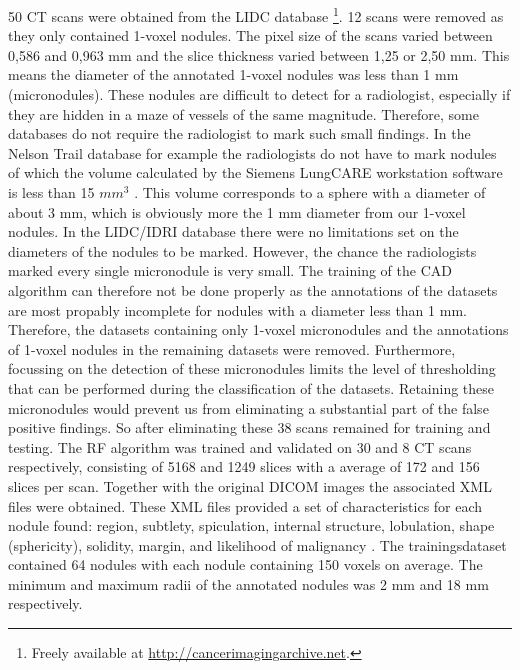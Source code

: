 50 CT scans were obtained from the LIDC database \footnote{Freely available
at \url{http://cancerimagingarchive.net}.}. 12 scans were removed as they only
contained 1-voxel nodules. The pixel size of the scans varied between 0,586 and
0,963 mm and the slice thickness varied between 1,25 or 2,50 mm. This means the
diameter of the annotated 1-voxel nodules was less than 1 mm (micronodules).
These nodules are difficult to detect for a radiologist, especially if they are
hidden in a maze of vessels of the same magnitude. Therefore, some databases do
not require the radiologist to mark such small findings. In the Nelson Trail
database for example the radiologists do not have to mark nodules of which the
volume calculated by the Siemens LungCARE workstation software is less than 15
$mm^3$ \cite{mur}. This volume corresponds to a sphere with a diameter of about
3 mm, which is obviously more the 1 mm diameter from our 1-voxel nodules.
In the LIDC/IDRI database there were no limitations set on the diameters of the
nodules to be marked. However, the chance the radiologists marked every single
micronodule is very small. The training of the CAD algorithm can therefore not
be done properly as the annotations of the datasets are most propably incomplete
for nodules with a diameter less than 1 mm. Therefore, the datasets containing
only 1-voxel micronodules and the annotations of 1-voxel nodules in the
remaining datasets were removed. Furthermore, focussing on the detection of
these micronodules limits the level of thresholding that can be performed during
the classification of the datasets. Retaining these micronodules would prevent
us from eliminating a substantial part of the false positive findings. So
after eliminating these 38 scans remained for training and testing.
The RF algorithm was trained and validated on 30 and 8 CT scans respectively,
consisting of 5168 and 1249 slices with a average of 172 and 156 slices per
scan. Together with the original DICOM images the associated XML files
were obtained. These XML files provided a set of characteristics for each nodule
found: region, subtlety, spiculation, internal structure, lobulation, shape
(sphericity), solidity, margin, and likelihood of malignancy \cite{lidcbase}.
The trainingsdataset contained 64 nodules with each nodule containing 150 voxels
on average. The minimum and maximum radii of the annotated nodules was 2 mm and
18 mm respectively.


